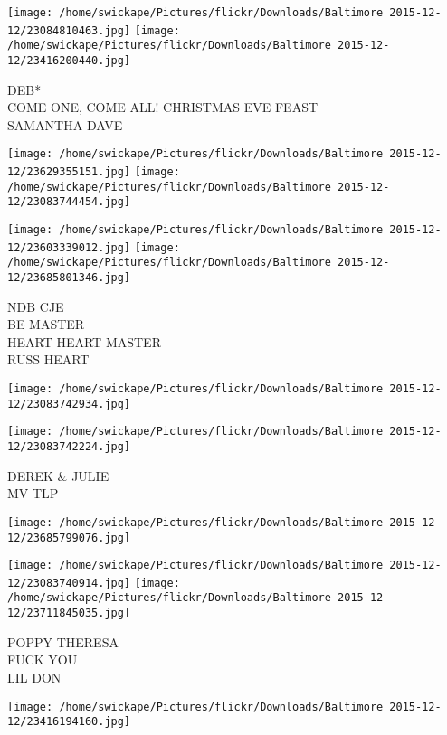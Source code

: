 \documentclass[10pt,letterpaper]{article}
\begin{document}
\vspace{0.25in}
\texttt{[image: /home/swickape/Pictures/flickr/Downloads/Baltimore 2015-12-12/23084810463.jpg]}
\texttt{[image: /home/swickape/Pictures/flickr/Downloads/Baltimore 2015-12-12/23416200440.jpg]}

DEB*\\
COME ONE, COME ALL!  CHRISTMAS EVE FEAST\\
SAMANTHA DAVE\\
\pagebreak

\texttt{[image: /home/swickape/Pictures/flickr/Downloads/Baltimore 2015-12-12/23629355151.jpg]}
\texttt{[image: /home/swickape/Pictures/flickr/Downloads/Baltimore 2015-12-12/23083744454.jpg]}

\texttt{[image: /home/swickape/Pictures/flickr/Downloads/Baltimore 2015-12-12/23603339012.jpg]}
\texttt{[image: /home/swickape/Pictures/flickr/Downloads/Baltimore 2015-12-12/23685801346.jpg]}

NDB CJE\\
BE MASTER\\
HEART HEART MASTER\\
RUSS HEART\\
\pagebreak

\texttt{[image: /home/swickape/Pictures/flickr/Downloads/Baltimore 2015-12-12/23083742934.jpg]}

\vspace{0.25in}
\texttt{[image: /home/swickape/Pictures/flickr/Downloads/Baltimore 2015-12-12/23083742224.jpg]}

DEREK \& JULIE\\
MV TLP\\
\pagebreak

\texttt{[image: /home/swickape/Pictures/flickr/Downloads/Baltimore 2015-12-12/23685799076.jpg]}

\vspace{0.25in}
\texttt{[image: /home/swickape/Pictures/flickr/Downloads/Baltimore 2015-12-12/23083740914.jpg]}
\texttt{[image: /home/swickape/Pictures/flickr/Downloads/Baltimore 2015-12-12/23711845035.jpg]}

POPPY THERESA\\
FUCK YOU\\
LIL DON\\
\pagebreak

\texttt{[image: /home/swickape/Pictures/flickr/Downloads/Baltimore 2015-12-12/23416194160.jpg]}
\end{document}
